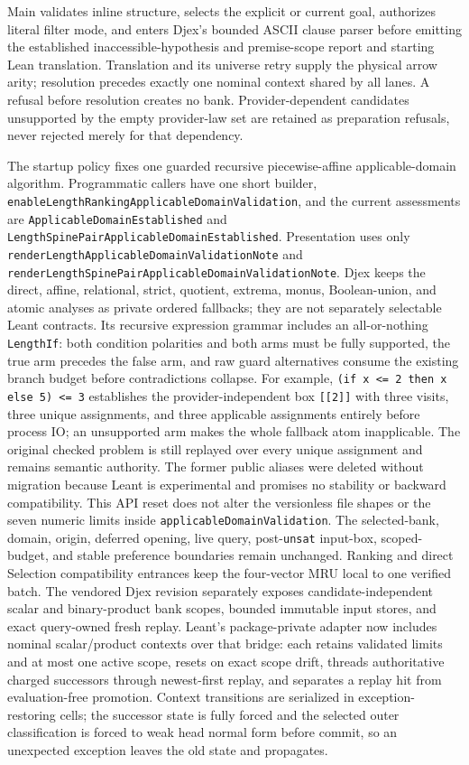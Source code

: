 \documentclass[11pt,oneside]{article}
\newcommand{\code}[1]{\texttt{#1}}
\begin{document}
Main validates inline structure, selects the explicit or current goal,
authorizes literal filter mode, and enters Djex's bounded ASCII clause parser
before emitting the established inaccessible-hypothesis and premise-scope
report and starting Lean translation. Translation and its universe retry
supply the physical arrow arity; resolution precedes exactly one nominal
context shared by all lanes. A refusal before resolution creates no bank.
Provider-dependent candidates unsupported by the empty provider-law set are
retained as preparation refusals, never rejected merely for that dependency.

The startup policy fixes one guarded recursive piecewise-affine applicable-domain
algorithm. Programmatic callers have one short builder,
\nolinkurl{enableLengthRankingApplicableDomainValidation}, and the current
assessments are \code{ApplicableDomainEstablished} and
\nolinkurl{LengthSpinePairApplicableDomainEstablished}. Presentation uses only
\nolinkurl{renderLengthApplicableDomainValidationNote} and
\nolinkurl{renderLengthSpinePairApplicableDomainValidationNote}. Djex keeps the
direct, affine, relational,
strict, quotient, extrema, monus, Boolean-union, and atomic analyses as private
ordered fallbacks; they are not separately selectable Leant contracts. Its
recursive expression grammar includes an all-or-nothing \code{LengthIf}:
both condition polarities and both arms must be fully supported, the true arm
precedes the false arm, and raw guard alternatives consume the existing branch
budget before contradictions collapse. For example,
\code{(if x <= 2 then x else 5) <= 3} establishes the provider-independent
box \code{[[2]]} with three visits, three unique assignments, and three
applicable assignments entirely before process IO; an unsupported arm makes
the whole fallback atom inapplicable. The original checked problem is still
replayed over every unique assignment and remains semantic authority. The
former public aliases were deleted without migration because Leant is
experimental and promises no stability or backward compatibility. This API
reset does not alter the versionless file shapes or the seven numeric limits
inside \code{applicableDomainValidation}. The selected-bank, domain, origin, deferred
opening, live query, post-\code{unsat} input-box, scoped-budget, and stable
preference boundaries remain unchanged. Ranking and direct Selection
compatibility entrances keep the four-vector MRU local to one verified batch.
The vendored Djex revision separately exposes candidate-independent scalar and
binary-product bank scopes, bounded immutable input stores, and exact
query-owned fresh replay. Leant's package-private adapter now includes nominal
scalar/product contexts over that bridge: each retains validated limits and at
most one active scope, resets on exact scope drift, threads authoritative
charged successors through newest-first replay, and separates a replay hit
from evaluation-free promotion. Context transitions are serialized in
exception-restoring cells; the successor state is fully forced and the selected
outer classification is forced to weak head normal form before commit, so an
unexpected exception leaves the old state and propagates.
\end{document}
